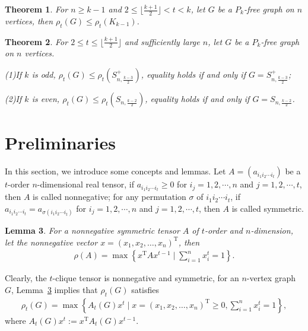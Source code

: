 \documentclass[preprint,12pt]{elsarticle}
\newtheorem{thm}{Theorem}[section]
\newtheorem{lem}[thm]{Lemma}
\begin{document}
        \begin{thm}\label{CT3-1}
            For $n \geq k-1$ and $2 \leq \lfloor \frac{k+1}{2} \rfloor < t < k $, let $G$ be a $P_{k}$-free graph on $n$ vertices, then $\rho_t(G) \leq \rho_t(K_{k-1})$.

        \end{thm}


        \begin{thm}\label{CT3}
            For $2 \leq t \leq \lfloor \frac{k+1}{2} \rfloor$ and sufficiently large $n$, let $G$ be a $P_{k}$-free graph on $n$ vertices.

            \noindent (1)If $k$ is odd, $\rho_t(G) \leq \rho_t(S_{n, \frac{k-3}{2} }^+)$, equality holds if and only if $G = S_{n, \frac{k-3}{2} }^+$;

            \noindent (2)If $k$ is even, $\rho_t(G) \leq \rho_t(S_{n, \frac{k-2}{2} })$, equality holds if and only if $G = S_{n, \frac{k-2}{2} }$.

		\end{thm}


\section{Preliminaries}

        In this section, we introduce some concepts and lemmas.
        Let $A = (a_{i_1i_2\cdots i_t})$ be a $t$-order $n$-dimensional real tensor, if $a_{i_1 i_2 \cdots i_t} \geq 0 $ for $i_j = 1, 2, \cdots, n$ and $j = 1, 2, \cdots, t$, then $A $ is called nonnegative; for any permutation $\sigma$ of $i_1 i_2 \cdots i_t$, if $a_{i_1 i_2 \cdots i_t} = a_{\sigma(i_1 i_2 \cdots i_t)}$ for $i_j = 1, 2, \cdots, n$ and $j = 1, 2, \cdots, t$, then $A $ is called symmetric.

        \begin{lem}\label{1L1}\cite{Qi2013}
            For a nonnegative symmetric tensor $A $ of $t$-order and $n$-dimension, let the nonnegative vector $x = (x_1, x_2, \dots, x_n)^\textrm{T}$, then
            \begin{align*}
                \rho(A) = \max\left\{ x^\textrm{T}Ax^{t-1}\mid \sum_{i=1}^{n} x_i^t = 1 \right\}.
            \end{align*}
		\end{lem}

        Clearly, the $t$-clique tensor is nonnegative and symmetric, for an $n$-vertex graph $G$, Lemma~\ref{1L1} implies that $\rho_t(G)$ satisfies
            \begin{align*}
                \rho_t(G)= \max\left\{ A_t(G)x^t \mid x = (x_1, x_2, \dots, x_n)^\textrm{T} \geq 0, \sum_{i=1}^{n} x_i^t = 1 \right\},
            \end{align*}
        where $A_t(G)x^t := x^\textrm{T}A_t(G)x^{t-1}$.
\end{document}
